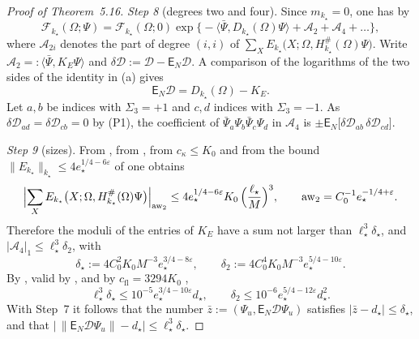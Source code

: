 \documentclass[11pt]{amsart}
\theoremstyle{definition}
\begin{document}
\begin{proof}[Proof of Theorem~5.16]
\emph{Step 8} (degrees two and four).
Since $m_{k_\star}=0$, one has by \cite{QEDIII}
\begin{equation*}
\mathscr F_{k_\star}(\Omega;\Psi)=\mathscr F_{k_\star}(\Omega;0)\exp\bigl\{-\langle\bar\Psi,D_{k_\star}(\Omega)\Psi\rangle+\mathcal A_2+\mathcal A_4+\dots\bigr\},
\end{equation*}
where $\mathcal A_{2i}$ denotes the part of degree $(i,i)$ of $\sum_XE_{k_\star}\bigl(X;\Omega,H^\#_{k_\star}(\Omega)\Psi\bigr)$.
Write $\mathcal A_2=:\langle\bar\Psi,K_E\Psi\rangle$ and $\delta\mathcal D:=\mathcal D-\mathsf E_N\mathcal D$.
A comparison of the logarithms of the two sides of the identity in (a) gives
\begin{equation*}
\mathsf E_N\mathcal D=D_{k_\star}(\Omega)-K_E .
\end{equation*}
Let $a,b$ be indices with $\Sigma_3=+1$ and $c,d$ indices with $\Sigma_3=-1$.
As $\delta\mathcal D_{ad}=\delta\mathcal D_{cb}=0$ by (P1), the coefficient of $\bar\Psi_a\Psi_b\bar\Psi_c\Psi_d$ in $\mathcal A_4$ is $\pm\mathsf E_N\bigl[\delta\mathcal D_{ab}\,\allowbreak \delta\mathcal D_{cd}\bigr]$.

\emph{Step 9} (sizes).
From \cite[Proposition~20.1\,(c)]{QEDIII}, from \cite[(k6)]{QEDIII}, from $c_\kappa\le K_0$ \cite{QEDIII} and from the bound $\|E_{k_\star}\|_{k_\star}\le4e_\star^{1/4-6\varepsilon}$ of \cite[Proposition~28.3\,(b)]{QEDIII} one obtains
\begin{equation*}
\Bigl|\sum_XE_{k_\star}\bigl(X;\Omega,H^\#_{k_\star}(\Omega)\Psi\bigr)\Bigr|_{\mathrm{aw}_2}\le4e_\star^{1/4-6\varepsilon}K_0\,\Bigl(\frac{\ell_\star}{M}\Bigr)^3,\qquad\mathrm{aw}_2=C_0^{-1}e_\star^{-1/4+\varepsilon}.
\end{equation*}
Therefore the moduli of the entries of $K_E$ have a sum not larger than $\ell_\star^3\delta_\star$, and $|\mathcal A_4|_1\le\ell_\star^3\delta_2$, with
\begin{equation*}
\delta_\star:=4C_0^2K_0M^{-3}e_\star^{3/4-8\varepsilon},\qquad\delta_2:=4C_0^4K_0M^{-3}e_\star^{5/4-10\varepsilon}.
\end{equation*}
By \cite[(T2)]{QEDIII}, valid by \cite[(Sc6)]{QEDIII}, and by $c_{\mathrm{fl}}=3294K_0$ \cite{QEDIII},
\begin{equation*}
\ell_\star^3\delta_\star\le10^{-5}e_\star^{3/4-10\varepsilon}d_\star,\qquad\delta_2\le10^{-6}e_\star^{5/4-12\varepsilon}d_\star^2 .
\end{equation*}
With Step~7 it follows that the number $\bar z:=(\Psi_u,\mathsf E_N\mathcal D\Psi_u)$ satisfies $|\bar z-d_\star|\le\delta_\star$, and that $\bigl|\,\allowbreak \|\mathsf E_N\mathcal D\Psi_u\|-d_\star\bigr|\le\ell_\star^3\delta_\star$.


\end{proof}
\end{document}
